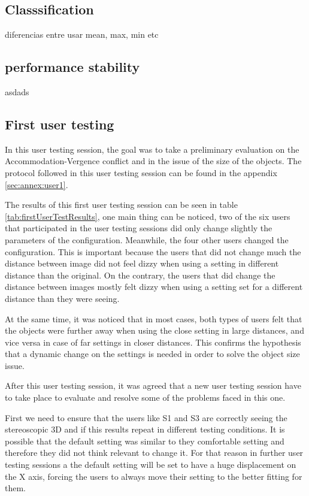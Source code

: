 \documentclass[10pt,a4paper,twocolumn,twoside]{article}
\begin{document}
	\subsection{Classsification}
	diferencias entre usar mean, max, min etc
	
	\subsection{performance stability}
	asdads

	
	
	\subsection{First user testing}
	
	In this user testing session, the goal was to take a preliminary evaluation on the Accommodation-Vergence conflict  and in the issue of the size of the objects. The protocol followed in this user testing session can be found in the appendix \ref{sec:annex:user1}.
	
	The results of this first user testing session can be seen in table \ref{tab:firstUserTestResults}, one main thing can be noticed, two of the six users that participated in the user testing sessions did only change slightly the parameters of the configuration. Meanwhile, the four other users changed the configuration. This is important because the users that did not change much the distance between image did not feel dizzy when using a setting in different distance than the original. On the contrary, the users that did change the distance between images mostly felt dizzy when using a setting set for a different distance than they were seeing.
	
	At the same time, it was noticed that in most cases, both types of users felt that the objects were further away when using the close setting in large distances, and vice versa in case of far settings in closer distances. This confirms the hypothesis that a dynamic change on the settings is needed in order to solve the object size issue.
	
	After this user testing session, it was agreed that a new user testing session have to take place to evaluate and resolve some of the problems faced in this one. 

	First we need to ensure that the users like S1 and S3 are correctly seeing the stereoscopic 3D and if this results repeat in different testing conditions. It is possible that the default setting was similar to they comfortable setting and therefore they did not think relevant to change it. For that reason in further user testing sessions a the default setting will be set to have a huge displacement on the X axis, forcing the users to always move their setting to the better fitting for them.
	
\end{document}
